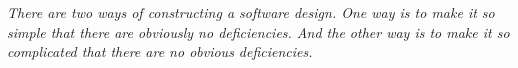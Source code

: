 
\thispagestyle{empty}
\null\vfill

\begin{center}
\Large
\parbox{13.5cm}{%
  \raggedright{\itshape There are two ways of constructing a software design.
   One way is to make it so simple that there are obviously no deficiencies.
   And the other way is to make it so complicated that there are no obvious deficiencies.}\\
  \vspace{0.4cm}
}
\end{center}

\vfill\vfill
